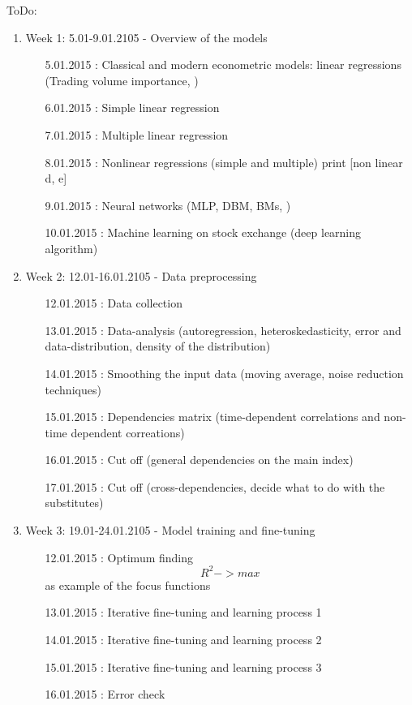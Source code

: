 \documentclass {article}
\begin{document}
ToDo:
\begin{enumerate}
	\item Week 1: 5.01-9.01.2105 - Overview of the models 
	\begin{enumerate}
		\item[5.01.2015]: Classical and modern econometric models:  linear regressions (Trading volume importance, ) 
		\item[6.01.2015]: Simple linear regression 	 		  
		\item[7.01.2015]: Multiple linear regression  
		\item[8.01.2015]: Nonlinear regressions (simple and multiple) print [non linear d, e]
		\item[9.01.2015]: Neural networks (MLP, DBM, BMs, )
		\item[10.01.2015]: Machine learning on stock exchange (deep learning algorithm)
	\end{enumerate}
	\item Week 2: 12.01-16.01.2105 - Data preprocessing
	\begin{enumerate}
		\item[12.01.2015]: Data collection 
		\item[13.01.2015]: Data-analysis (autoregression, heteroskedasticity, error and data-distribution, density of the distribution)
		\item[14.01.2015]: Smoothing the input data (moving average, noise reduction techniques)
		\item[15.01.2015]: Dependencies matrix  (time-dependent correlations and non-time dependent correations)
		\item[16.01.2015]: Cut off (general dependencies on the main index)
		\item[17.01.2015]: Cut off (cross-dependencies, decide what to do with the substitutes)
	\end{enumerate}
	\item Week 3: 19.01-24.01.2105 - Model training and fine-tuning
	\begin{enumerate}
		\item[12.01.2015]: Optimum finding  \[ R^2 -> max \] as example of the focus functions
		\item[13.01.2015]: Iterative fine-tuning and learning process 1
		\item[14.01.2015]: Iterative fine-tuning and learning process 2
		\item[15.01.2015]: Iterative fine-tuning and learning process 3
		\item[16.01.2015]: Error check

\end{enumerate}
\end{enumerate}
\end{document}
